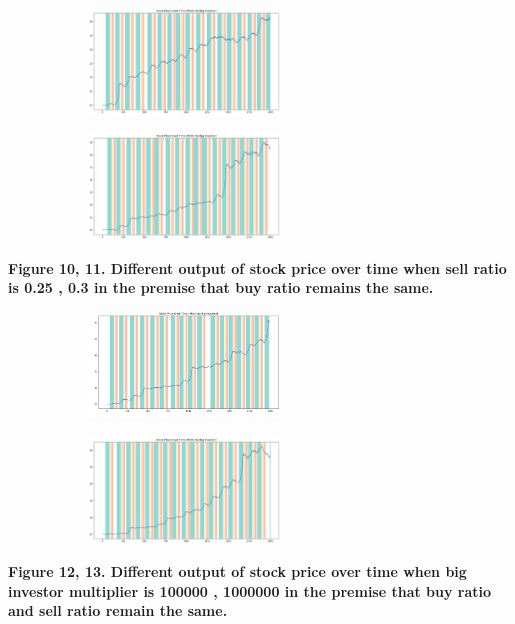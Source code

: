 \documentclass[a4paper, 12pt]{article}
\begin{document}
\begin{figure}[h]
    \centering
    \begin{subfigure}{0.45\textwidth}
        \centering
        \includegraphics[height=80pt,width=\textwidth]{p4.png}
        \label{fig:my_label10}
    \end{subfigure}
    \hfill
    \begin{subfigure}{0.45\textwidth}
        \centering
        \includegraphics[height=80pt,width=\textwidth]{p5.png}
        \label{fig:my_label11}
    \end{subfigure}
\end{figure}

\textbf{Figure 10, 11. Different output of stock price over time when sell ratio is 0.25 , 0.3 in the premise that buy ratio remains the same.}\par

\begin{figure}[h]
    \centering
    \begin{subfigure}{0.45\textwidth}
        \centering
        \includegraphics[height=80pt,width=\textwidth]{p1.png}
        \label{fig:my_label12}
    \end{subfigure}
    \hfill
    \begin{subfigure}{0.45\textwidth}
        \centering
        \includegraphics[height=80pt,width=\textwidth]{p6.png}
        \label{fig:my_label13}
    \end{subfigure}
\end{figure}



\textbf{Figure 12, 13. Different output of stock price over time when big investor multiplier is 100000 , 1000000 in the premise that buy ratio and sell ratio remain the same.}\par
\end{document}
